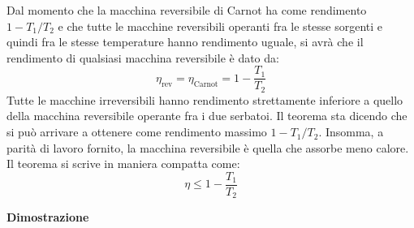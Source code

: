 \documentclass[10pt,a4paper]{book}
\begin{document}
\noindent{}

Dal momento che la macchina reversibile di Carnot ha come rendimento $1-T_1/T_2$ e che tutte le macchine reversibili operanti fra le stesse sorgenti e quindi fra le stesse temperature hanno rendimento uguale, si avrà che il rendimento di qualsiasi macchina reversibile è dato da:
\[
	\eta_{\text{rev} } = \eta_{\text{Carnot} } = 1 - \frac{T_1 }{T_2 }
\]
Tutte le macchine irreversibili hanno rendimento strettamente inferiore a quello della macchina reversibile operante fra i due serbatoi. Il teorema sta dicendo che si può arrivare a ottenere come rendimento massimo $1-T_1/T_2$.
Insomma, a parità di lavoro fornito, la macchina reversibile è quella che assorbe meno calore. Il teorema si scrive in maniera compatta come:
\[
	\boxed{\eta \le 1-\frac{T_1}{T_2}}
\]

\textbf{Dimostrazione}
\end{document}
